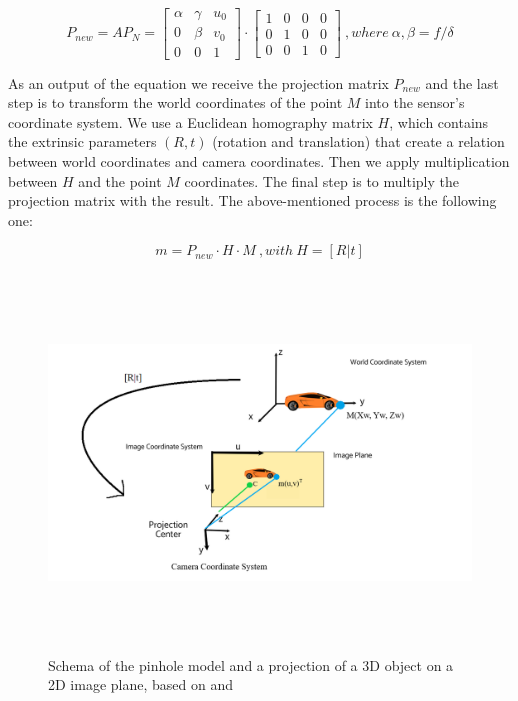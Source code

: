 \begin{equation}
    P_{new} = A P_{N} = \begin{bmatrix}
                        \alpha & \gamma & u_{0}\\
                        0 & \beta & v_{0}\\
                        0 & 0 & 1\end{bmatrix} \cdot \begin{bmatrix}
                        1 & 0 & 0 & 0\\
                        0 & 1 & 0 & 0\\
                        0 & 0 & 1 & 0\end{bmatrix} \: , where \: \alpha, \beta = f / \delta
\end{equation}

As an output of the equation we receive the projection matrix $P_{new}$ and the last step is to transform the world coordinates of the point $M$ into the sensor's coordinate system. We use a Euclidean homography matrix $H$, which contains the extrinsic parameters $(R,t)$ (rotation and translation) that create a relation between world coordinates and camera coordinates. Then we apply multiplication between $H$ and the point $M$ coordinates. The final step is to multiply the projection matrix with the result. The above-mentioned process is the following one:

\begin{equation}
m = P_{new} \cdot H \cdot M \:, with \: H = [R|t] 
\end{equation}

\begin{figure} [h]
\centering
\includegraphics[width = \textwidth, height = 10cm]{images/camera_model_pic.png}
\caption[Single camera's model]{Schema of the pinhole model and a projection of a 3D object on a 2D image plane, based on \cite{camera_pinhole_model} and \cite{second_model_of_camera} \label{fig:camera_model}}
\end{figure}

